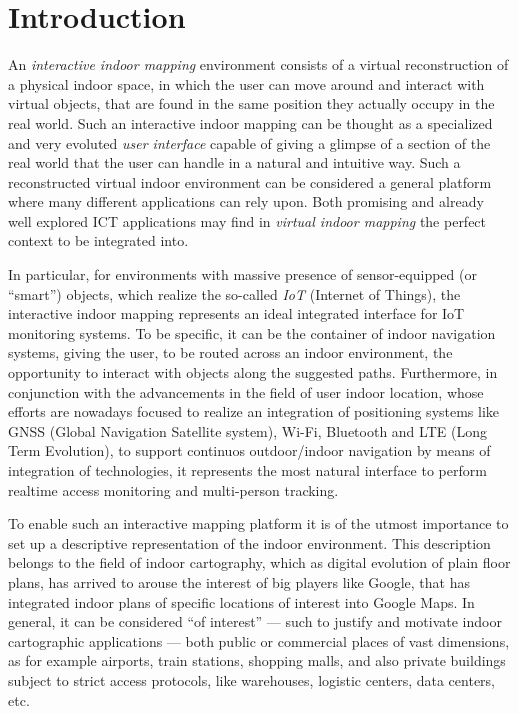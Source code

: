 \section{Introduction}\label{introduction}

An \emph{interactive indoor mapping} environment consists of a virtual reconstruction
of a physical indoor space, in which the user can move around and interact
with virtual objects, that are found in the same position they actually occupy in the
real world. Such an interactive indoor mapping can be thought as a specialized
and very evoluted \emph{user interface} capable of giving a glimpse of a section of
the real world that the user can handle in a natural and intuitive way. Such
a reconstructed virtual indoor environment can be considered a general
platform where many different applications can rely upon. Both promising and
already well explored ICT applications may find in \emph{virtual indoor mapping} the
perfect context to be integrated into.

In particular, for environments with massive presence of sensor-equipped (or
``smart'') objects, which realize the so-called \emph{IoT} (Internet of
Things), the interactive indoor mapping represents an ideal integrated
interface for IoT monitoring systems. To be specific, it can be the container
of indoor navigation systems, giving the user, to be routed across an indoor
environment, the opportunity to interact with objects along the suggested
paths. Furthermore, in conjunction with the advancements in the field of user
indoor location, whose efforts are nowadays focused to realize an integration
of positioning systems like GNSS (Global Navigation Satellite system), Wi-Fi,
Bluetooth and LTE (Long Term Evolution), to support continuos outdoor/indoor
navigation by means of integration of technologies, it represents the most
natural interface to perform realtime access monitoring and multi-person
tracking.

To enable such an interactive mapping platform it is of the utmost importance
to set up  a descriptive representation of the indoor environment. 
 This description belongs to  the field of indoor cartography,
which as digital evolution of plain floor plans, has arrived to arouse the
interest of big players like Google, that has integrated indoor plans of
specific locations of interest \cite{indoormaps} into Google Maps. In general,
it can be considered ``of interest'' --- such to justify and motivate indoor
cartographic applications --- both public or commercial places of vast
dimensions, as for example airports, train stations, shopping malls, and also
private buildings subject to strict access protocols, like warehouses,
logistic centers, data centers, etc.

